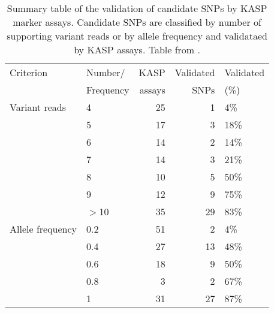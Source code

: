 
\begin{table}

\centering
\caption{Summary table of the validation of candidate SNPs by KASP marker assays. Candidate SNPs are classified by number of supporting variant reads or by allele frequency and validataed by KASP assays. Table from \citet{King2015}.}
\label{tab:poly:mutSummary}

\begin{tabular}{llrrl}
\toprule
 Criterion        & Number/   &   KASP  &   Validated  & Validated   \\
          & Frequency   &    assays &    SNPs &  (\%)   \\
\midrule
Variant reads     & 4                  &            25 &                1 & 4\%              \\
                  & 5                  &            17 &                3 & 18\%             \\
                  & 6                  &            14 &                2 & 14\%             \\
                  & 7                  &            14 &                3 & 21\%             \\
                  & 8                  &            10 &                5 & 50\%             \\
                  & 9                  &            12 &                9 & 75\%             \\
                  & \ensuremath{>}10                &            35 &               29 & 83\%             \\
\midrule
 Allele frequency & 0.2                &            51 &                2 & 4\%              \\
                  & 0.4                &            27 &               13 & 48\%             \\
                  & 0.6                &            18 &                9 & 50\%             \\
                  & 0.8                &             3 &                2 & 67\%             \\
                  & 1                  &            31 &               27 & 87\%             \\
\bottomrule
\end{tabular}
\end{table}